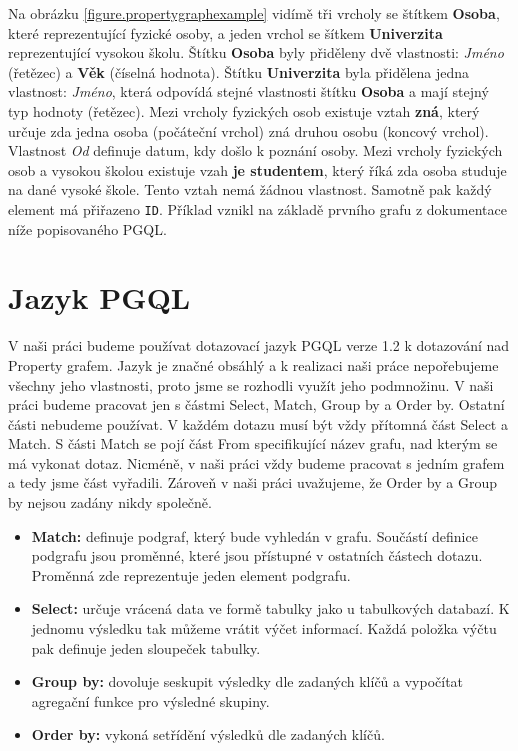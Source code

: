 Na obrázku \ref{figure.propertygraphexample} vidímě tři vrcholy se štítkem \textbf{Osoba}, které reprezentující fyzické osoby, a jeden vrchol se šítkem \textbf{Univerzita} reprezentující vysokou školu.
Štítku \textbf{Osoba} byly přiděleny dvě vlastnosti: \textit{Jméno} (řetězec) a \textbf{Věk} (číselná hodnota).
Štítku \textbf{Univerzita} byla přidělena jedna vlastnost: \textit{Jméno}, která odpovídá stejné vlastnosti štítku \textbf{Osoba} a mají stejný typ hodnoty (řetězec).
Mezi vrcholy fyzických osob existuje vztah \textbf{zná}, který určuje zda jedna osoba (počáteční vrchol) zná druhou osobu (koncový vrchol).
Vlastnost \textit{Od} definuje datum, kdy došlo k poznání osoby.
Mezi vrcholy fyzických osob a vysokou školou existuje vzah \textbf{je studentem}, který říká zda osoba studuje na dané vysoké škole.
Tento vztah nemá žádnou vlastnost.
Samotně pak každý element má přiřazeno \texttt{ID}.
Příklad vznikl na základě prvního grafu z dokumentace níže popisovaného PGQL.

\section{Jazyk PGQL}
\label{req.pgql}

V naši práci budeme používat dotazovací jazyk PGQL \citep{pgql} verze 1.2 k dotazování nad Property grafem.
Jazyk je značné obsáhlý a k realizaci naši práce nepořebujeme všechny jeho vlastnosti, proto jsme se rozhodli využít jeho podmnožinu.
V naši práci budeme pracovat jen s částmi Select, Match, Group by a Order by.
Ostatní části nebudeme používat.
V každém dotazu musí být vždy přítomná část Select a Match.
S části Match se pojí část From specifikující název grafu, nad kterým se má vykonat dotaz.
Nicméně, v naši práci vždy budeme pracovat s jedním grafem a tedy jsme část vyřadili. 
Zároveň v naši práci uvažujeme, že Order by a Group by nejsou zadány nikdy společně.

\begin{itemize}
\item \textbf{Match:} definuje podgraf, který bude vyhledán v grafu.
Součástí definice podgrafu jsou proměnné, které jsou přístupné v ostatních částech dotazu.
Proměnná zde reprezentuje jeden element podgrafu.

\item \textbf{Select:} určuje vrácená data ve formě tabulky jako u tabulkových databazí.
K jednomu výsledku tak můžeme vrátit výčet informací.
Každá položka výčtu pak definuje jeden sloupeček tabulky.

\item \textbf{Group by:} dovoluje seskupit výsledky dle zadaných klíčů a vypočítat agregační funkce pro výsledné skupiny.

\item \textbf{Order by:} vykoná setřídění výsledků dle zadaných klíčů.
\end{itemize}

